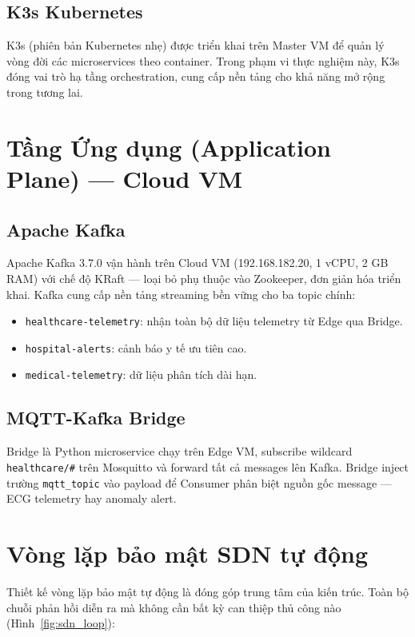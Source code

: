 \subsection{K3s Kubernetes}

K3s (phiên bản Kubernetes nhẹ) được triển khai trên Master VM để quản lý vòng đời các microservices theo container. Trong phạm vi thực nghiệm này, K3s đóng vai trò hạ tầng orchestration, cung cấp nền tảng cho khả năng mở rộng trong tương lai.

\section{Tầng Ứng dụng (Application Plane) — Cloud VM}

\subsection{Apache Kafka}

Apache Kafka 3.7.0 vận hành trên Cloud VM (192.168.182.20, 1 vCPU, 2 GB RAM) với chế độ KRaft — loại bỏ phụ thuộc vào Zookeeper, đơn giản hóa triển khai. Kafka cung cấp nền tảng streaming bền vững cho ba topic chính:

\begin{itemize}
    \item \texttt{healthcare-telemetry}: nhận toàn bộ dữ liệu telemetry từ Edge qua Bridge.
    \item \texttt{hospital-alerts}: cảnh báo y tế ưu tiên cao.
    \item \texttt{medical-telemetry}: dữ liệu phân tích dài hạn.
\end{itemize}

\subsection{MQTT-Kafka Bridge}

Bridge là Python microservice chạy trên Edge VM, subscribe wildcard \texttt{healthcare/\#} trên Mosquitto và forward tất cả messages lên Kafka. Bridge inject trường \texttt{mqtt\_topic} vào payload để Consumer phân biệt nguồn gốc message — ECG telemetry hay anomaly alert.

\section{Vòng lặp bảo mật SDN tự động}

Thiết kế vòng lặp bảo mật tự động là đóng góp trung tâm của kiến trúc. Toàn bộ chuỗi phản hồi diễn ra mà không cần bất kỳ can thiệp thủ công nào (Hình~\ref{fig:sdn_loop}):

